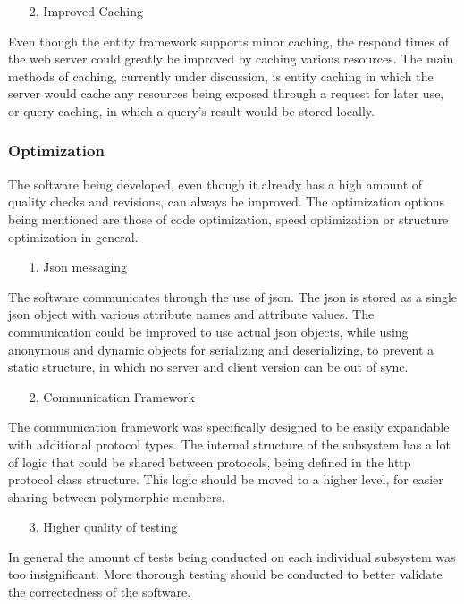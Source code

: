 \begin{enumerate}
\item[2.] Improved Caching
\end{enumerate}
Even though the entity framework supports minor caching, the respond times of the web server could greatly be improved by caching various resources.
The main methods of caching, currently under discussion, is entity caching in which the server would cache any resources being exposed through a request for later use, or query caching, in which a query's result would be stored locally.

\subsubsection{Optimization}

The software being developed, even though it already has a high amount of quality checks and revisions, can always be improved.
The optimization options being mentioned are those of code optimization, speed optimization or structure optimization in general.

\begin{enumerate}
\item[1.] Json messaging
\end{enumerate}
The software communicates through the use of json. The json is stored as a single json object with various attribute names and attribute values.
The communication could be improved to use actual json objects, while using anonymous and dynamic objects for serializing and deserializing, to prevent a static structure, in which no server and client version can be out of sync.

\begin{enumerate}
\item[2.] Communication Framework
\end{enumerate}
The communication framework was specifically designed to be easily expandable with additional protocol types. The internal structure of the subsystem has a lot of logic that could be shared between protocols, being defined in the http protocol class structure. This logic should be moved to a higher level, for easier sharing between polymorphic members.

\begin{enumerate}
\item[3.] Higher quality of testing
\end{enumerate}
In general the amount of tests being conducted on each individual subsystem was too insignificant. More thorough testing should be conducted to better validate the correctedness of the software.

